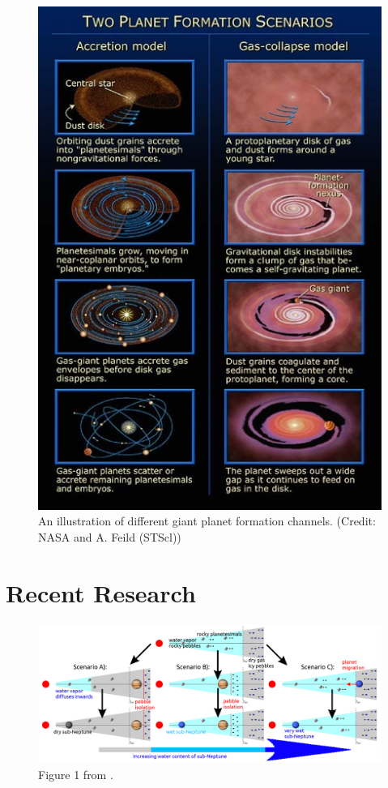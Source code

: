 \documentclass[twocolumn]{aastex631}
\begin{document}
\begin{figure}[htb]
    \centering
    \includegraphics[width=\columnwidth]{channels_illustration.jpg}
    \caption{An illustration of different giant planet formation channels. (Credit: NASA and A. Feild (STScl))}
    \label{fig:formation_diagram}
\end{figure}

\section{Recent Research}

\begin{figure}
    \centering
    \includegraphics[width=\textwidth]{water_cartoon.png}
    \caption{Figure 1 from \citet{Bitsch+2021}.}
\end{figure}
\end{document}
